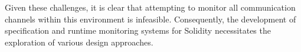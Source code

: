Given these challenges, it is clear that attempting to monitor all communication channels within this environment is infeasible. 
Consequently, the development of specification and runtime monitoring systems for Solidity necessitates the exploration of various design approaches.









